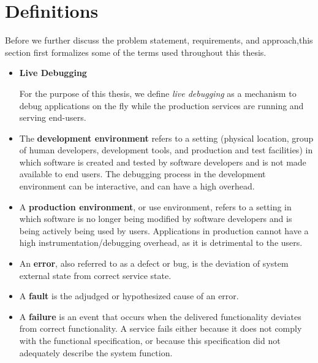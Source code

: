 \section{Definitions}
\label{sec:introDefinition}

Before we further discuss the problem statement, requirements, and approach,this section first formalizes some of the terms used throughout this thesis.

\begin{itemize}
	
	\item \hypertarget{defn:livedebugging}{\textbf{Live Debugging}}
	For the purpose of this thesis, we define \emph{live debugging} as a mechanism to debug applications on the fly while the production services are running and serving end-users.
	
	\item The \hypertarget{defn:development-environment}{\textbf{development environment}} refers to a setting (physical location, group of human developers, development tools, and production and test facilities) in which software is created and tested by software developers and is not made available to end users.
	The debugging process in the development environment can be interactive, and can have a high overhead.
	
	\item A \hypertarget{defn:production-environment}{\textbf{production environment}}, or use environment, refers to a setting in which software is no longer being modified by software developers and is being actively being used by users.
	Applications in production cannot have a high instrumentation/debugging overhead, as it is detrimental to the users.
	
	\item An \hypertarget{defn:error}{\textbf{error}}, also referred to as a defect or bug, is the deviation of system external state from correct service state.
	
	\item A \hypertarget{defn:fault}{\textbf{fault}} is the adjudged or hypothesized cause of an error.
	
	\item A \hypertarget{defn:failure}{\textbf{failure}} is an event that occurs when the delivered functionality deviates from correct functionality.
	A service fails either because it does not comply with the functional specification, or because this specification did not adequately describe the system function.
	

\end{itemize}
